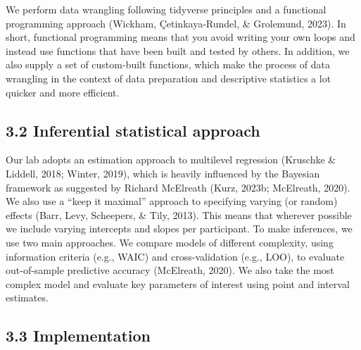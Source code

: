 \documentclass[
  man, donotrepeattitle,floatsintext]{apa6}
\begin{document}
We perform data wrangling following tidyverse principles and a functional programming approach (Wickham, Çetinkaya-Rundel, \& Grolemund, 2023).
In short, functional programming means that you avoid writing your own loops and instead use functions that have been built and tested by others.
In addition, we also supply a set of custom-built functions, which make the process of data wrangling in the context of data preparation and descriptive statistics a lot quicker and more efficient.

\subsection{3.2 Inferential statistical approach}\label{inferential-statistical-approach}

Our lab adopts an estimation approach to multilevel regression (Kruschke \& Liddell, 2018; Winter, 2019), which is heavily influenced by the Bayesian framework as suggested by Richard McElreath (Kurz, 2023b; McElreath, 2020). We also use a ``keep it maximal'' approach to specifying varying (or random) effects (Barr, Levy, Scheepers, \& Tily, 2013). This means that wherever possible we include varying intercepts and slopes per participant.
To make inferences, we use two main approaches. We compare models of different complexity, using information criteria (e.g., WAIC) and cross-validation (e.g., LOO), to evaluate out-of-sample predictive accuracy (McElreath, 2020). We also take the most complex model and evaluate key parameters of interest using point and interval estimates.

\subsection{3.3 Implementation}\label{implementation}
\end{document}
